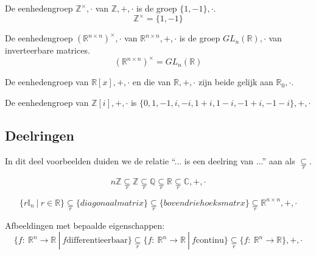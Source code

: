 \documentclass[main.tex]{subfiles}
\begin{document}
\begin{vb}
  De eenhedengroep $\mathbb{Z}^{\times},\cdot$ van $\mathbb{Z},+,\cdot$ is de groep $\{1,-1\},\cdot$.
  \[ \mathbb{Z}^{\times} = \{1,-1\}\]
\end{vb}

\begin{vb}
  De eenhedengroep $(\mathbb{R}^{n\times n})^{\times},\cdot$ van $\mathbb{R}^{n\times n},+,\cdot$ is de groep $GL_{n}(\mathbb{R}),\cdot$ van inverteerbare matrices.
  \[ (\mathbb{R}^{n\times n})^{\times} = GL_{n}(\mathbb{R}) \]
\end{vb}

\begin{vb}
  De eenhedengroep van $\mathbb{R}[x],+,\cdot$ en die van $\mathbb{R},+,\cdot$ zijn beide gelijk aan  $\mathbb{R}_{0},\cdot$.
\end{vb}

\begin{vb}
  De eenhedengroep van $\mathbb{Z}[i],+,\cdot$ is $\{0,1,-1,i,-i,1+i,1-i,-1+i,-1-i\},+,\cdot$
\end{vb}


\subsection{Deelringen}
\label{sec:deelringen}

In dit deel voorbeelden duiden we de relatie ``... is een deelring van ...'' aan als $\underset{r}{\subseteq}$.

\begin{vb}
  \[ n\mathbb{Z}\underset{r}{\subseteq} \mathbb{Z} \underset{r}{\subseteq} \mathbb{Q} \underset{r}{\subseteq} \mathbb{R} \underset{r}{\subseteq} \mathbb{C},+,\cdot \]
\end{vb}

\begin{vb}
  \[ \{ r\mathbb{I}_{n} \ |\ r \in \mathbb{R} \} \underset{r}{\subseteq} \{diagonaalmatrix\} \underset{r}{\subseteq}  \{bovendriehoeksmatrx\} \underset{r}{\subseteq} \mathbb{R}^{n\times n},+,\cdot \]
\end{vb}

\begin{vb}
  Afbeeldingen met bepaalde eigenschappen:
  \[ \{ f:\ \mathbb{R}^{n} \rightarrow \mathbb{R} \ |\ f \text{differentieerbaar} \} \underset{r}{\subseteq} \{ f:\ \mathbb{R}^{n} \rightarrow \mathbb{R} \ |\ f \text{continu} \}  \underset{r}{\subseteq} \{ f:\ \mathbb{R}^{n} \rightarrow \mathbb{R} \},+,\cdot \]
\end{vb}
\end{document}
